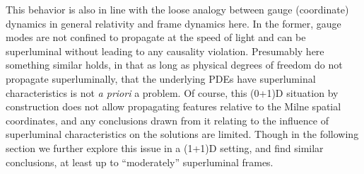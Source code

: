 \documentclass[%
notitlepage,
superscriptaddress,
nofootinbib,
amsmath,
amssymb,
aps,
twocolumn
]{revtex4-1}
\begin{document}
This behavior is also in line with the loose analogy between gauge
(coordinate) dynamics in general relativity and frame dynamics here. In the
former, gauge modes are not confined to propagate at the speed of
light and can be superluminal without leading to any causality violation.
Presumably here something similar holds, in that as long as physical
degrees of freedom do not propagate superluminally, that the underlying
PDEs have superluminal characteristics is not {\em a priori} a problem. Of
course, this (0+1)D situation by construction does not allow propagating
features relative to the Milne spatial coordinates, and any conclusions
drawn from it relating to the influence of superluminal characteristics on
the solutions are limited. Though in the following section we further
explore this issue in a (1+1)D setting, and find similar conclusions, at
least up to ``moderately'' superluminal frames.
\end{document}
